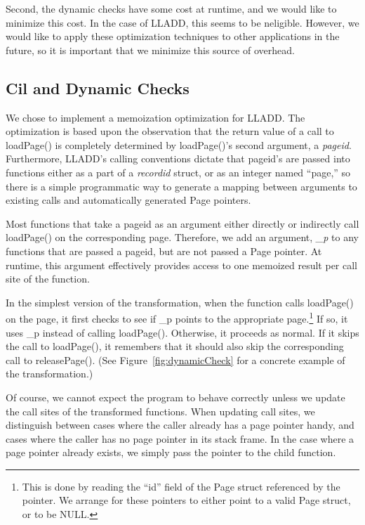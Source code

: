 \documentclass[10pt,letterpaper,twocolumn,english]{article}
\newcommand{\yad}{LLADD\xspace}
\newcommand{\pin}{loadPage()\xspace}
\newcommand{\unpin}{releasePage()\xspace}
\newcommand{\PP}{\_p\xspace}
\begin{document}
Second,
the dynamic checks have some cost at runtime, and we would like to
minimize this cost.  In the case of \yad, this seems to be neligible.
However, we would like to apply these optimization techniques to other
applications in the future, so it is important that we minimize this
source of overhead.

\subsection{Cil and Dynamic Checks}

We chose to implement a memoization optimization for \yad.  The
optimization is based upon the observation that the return value of a
call to \pin is completely determined by \pin's second argument, a {\em
pageid}.  Furthermore, \yad's calling conventions dictate that
pageid's are passed into functions either as a part of a {\em
recordid} struct, or as an integer named ``page,'' so there is a
simple programmatic way to generate a mapping between arguments to
existing calls and automatically generated Page pointers.

Most functions that take a pageid as an argument either directly or
indirectly call \pin on the corresponding page.  Therefore, we add an
argument, {\em\PP} to any functions that are passed a pageid, but are
not passed a Page pointer.  At runtime, this argument effectively
provides access to one memoized result per call site of the
function.

In the simplest version of the transformation, when the function calls
\pin on the page, it first checks to see if \PP points to the
appropriate page.\footnote{This is done by reading the ``id'' field of
the Page struct referenced by the pointer.  We arrange for these
pointers to either point to a valid Page struct, or to be NULL.}  If
so, it uses \PP instead of calling \pin.  Otherwise, it proceeds as
normal.  If it skips the call to \pin, it remembers that it should
also skip the corresponding call to \unpin.  (See
Figure~\ref{fig:dynamicCheck} for a concrete example of the
transformation.)

Of course, we cannot expect the program to behave correctly unless we
update the call sites of the transformed functions.  When updating
call sites, we distinguish between cases where the caller already has
a page pointer handy, and cases where the caller has no page pointer
in its stack frame.  In the case where a page pointer already exists,
we simply pass the pointer to the child function.
\end{document}
